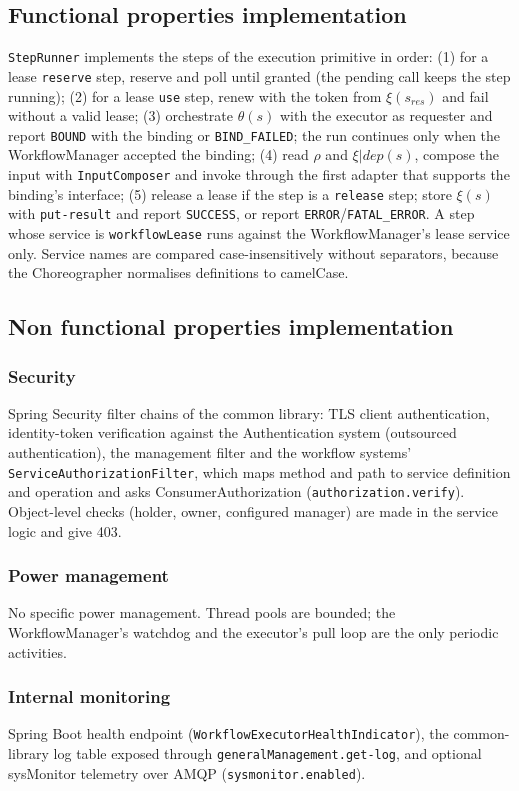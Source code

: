 \documentclass[a4paper]{arrowhead}
\begin{document}
\subsection{Functional properties implementation}
\texttt{StepRunner} implements the steps of the execution primitive in order: (1) for a lease
\texttt{reserve} step, reserve and poll until granted (the pending call keeps the step running); (2) for a lease
\texttt{use} step, renew with the token from $\xi(s_{res})$ and fail without a valid lease; (3) orchestrate
$\theta(s)$ with the executor as requester and report \texttt{BOUND} with the binding or \texttt{BIND\_FAILED}; the run
continues only when the WorkflowManager accepted the binding; (4) read $\rho$ and $\xi|dep(s)$, compose the input with
\texttt{InputComposer} and invoke through the first adapter that supports the binding's interface; (5) release a
lease if the step is a \texttt{release} step; store $\xi(s)$ with \texttt{put-result} and report \texttt{SUCCESS}, or
report \texttt{ERROR}/\texttt{FATAL\_ERROR}. A step whose service is \texttt{workflowLease} runs against the
WorkflowManager's lease service only. Service names are compared case-insensitively without separators, because the
Choreographer normalises definitions to camelCase.

\subsection{Non functional properties implementation}
\subsubsection{Security}
Spring Security filter chains of the common library: TLS client authentication, identity-token verification against
the Authentication system (outsourced authentication), the management filter and the workflow systems'
\texttt{Service\allowbreak{}Authorization\allowbreak{}Filter}, which maps method and path to service definition and operation and asks
ConsumerAuthorization (\texttt{authorization.\allowbreak{}verify}). Object-level checks (holder, owner, configured manager) are made in
the service logic and give 403.
\subsubsection{Power management}
No specific power management. Thread pools are bounded; the WorkflowManager's watchdog and the executor's pull loop are
the only periodic activities.
\subsubsection{Internal monitoring}
Spring Boot health endpoint (\texttt{Workflow\allowbreak{}Executor\allowbreak{}Health\allowbreak{}Indicator}),
the common-library log table exposed through \texttt{general\allowbreak{}Management.\allowbreak{}get-\allowbreak{}log}, and optional sysMonitor telemetry over
AMQP (\texttt{sysmonitor.\allowbreak{}enabled}).
\end{document}
